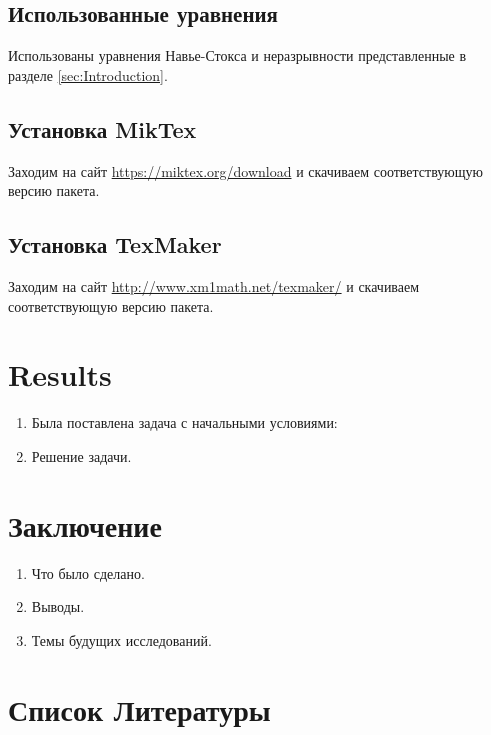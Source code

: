 \documentclass[11pt]{article}
\begin{document}
\subsection{Использованные уравнения}\label{sec:FlowEqs}
Использованы уравнения Навье-Стокса и неразрывности представленные в разделе \ref{sec:Introduction}.

\subsection{Установка MikTex}\label{sec:MikTex}
Заходим на сайт \url{https://miktex.org/download} и скачиваем соответствующую версию пакета.

\subsection{Установка TexMaker}\label{sec:MikTex}
Заходим на сайт \url{http://www.xm1math.net/texmaker/} и скачиваем соответствующую версию пакета.

\section{Results\label{sec:Results}}
	\begin{enumerate}
		\item Была поставлена задача с начальными условиями:
		\item Решение задачи.
	\end{enumerate}
	
\section{Заключение}

	\begin{enumerate}
		\item Что было сделано.
		\item Выводы.
		\item Темы будущих исследований.
	\end{enumerate}
	
\section{Список Литературы} 
\end{document}
